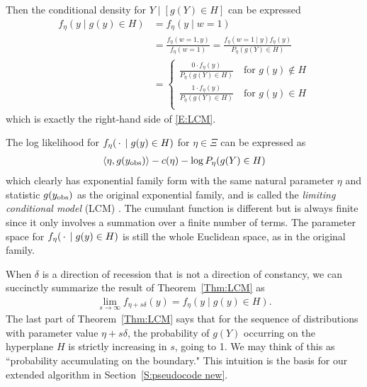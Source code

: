 Then the conditional density for $Y \mid [g(Y)\in H]$ can be expressed
\begin{align*}
	f_\eta(y \mid g(y) \in H) &= f_\eta(y \mid w=1) \\
					&= \frac{f_\eta(w=1, y)}{f_\eta(w=1)}	
					= \frac{f_\eta(w=1 \mid y) f_\eta(y)}{P_\eta(g(Y) \in H)}  \\%
	&= \begin{cases}
 			\frac{0 \cdot f_\eta(y)}{P_\eta(g(Y) \in H)}   \quad 
					 \text{for $g(y) \notin H$}	\\
 			\frac{1 \cdot f_\eta(y)}{P_\eta(g(Y) \in H)}   \quad 
					 \text{for $g(y) \in H$}	\\
 		\end{cases}
\end{align*}
which is exactly the right-hand side of \eqref{E:LCM}.

The log likelihood for $f_\eta( \,\cdot\, \mid g(y) \in H)$ for $\eta \in \Xi$ can be expressed as
\begin{align*}
	\langle \eta, g(y_{\text{obs}}) \rangle - c(\eta) - \log P_\eta(g(Y) \in H) 
\end{align*}
which clearly has exponential family form with the same natural parameter $\eta$ and 
statistic $g(y_{\text{obs}})$ as the original exponential family,
and is called the \emph{limiting conditional model} (LCM) \citep{Geyer:gdor}.  
The cumulant function is different but is always finite since it only 
involves a summation over a finite number of terms.  The parameter space for 
$f_\eta( \,\cdot\, \mid g(y) \in H)$ is still the 
whole Euclidean space, as in the original family.  

When $\delta$ is a direction of recession that is not a direction of constancy, 
we can succinctly summarize the result of Theorem~\ref{Thm:LCM} as
\begin{align*}
\lim_{s \to \infty} f_{\eta+s\delta}(y) = f_{\eta}( y \mid g(y) \in H).
\end{align*}
The last part of Theorem~\ref{Thm:LCM} says that for the sequence of distributions with parameter 
value $\eta+s\delta$, the probability of $g(Y)$ occurring on the hyperplane $H$ is strictly 
increasing in $s$, going to 1.  We may think of this as 
``probability accumulating on the boundary."  This intuition is the basis for our
extended algorithm in Section~\ref{S:pseudocode new}.

